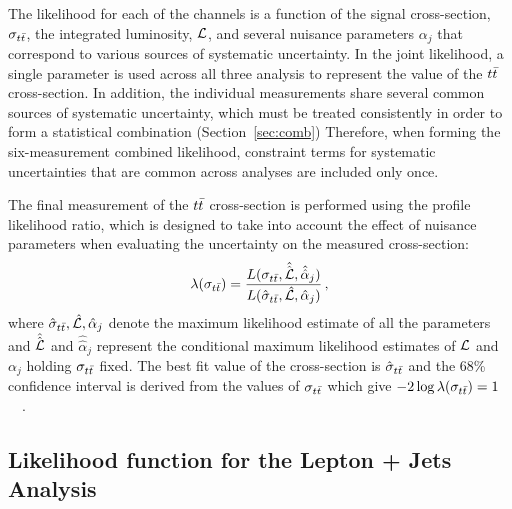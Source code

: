 The likelihood for each of the channels is a function of the signal cross-section, $\sigma_{t\bar{t}}$, the integrated luminosity, ${\cal L}$, and several nuisance parameters $\alpha_j$ that correspond to various sources of systematic uncertainty.
In the joint likelihood, a single parameter is used across all three analysis to represent the value of the $t\bar{t}$ cross-section.
In addition, the individual measurements share several common sources of systematic uncertainty,
which must be treated consistently in order to form a statistical combination (Section~\ref{sec:comb})
Therefore, when forming the six-measurement combined likelihood, constraint terms for systematic uncertainties that are common across analyses are included only once.


The final measurement of the $t\bar{t}$ cross-section is performed using the profile likelihood ratio,
which is designed to take into account the effect of nuisance parameters when evaluating the uncertainty on the measured cross-section:
\begin{equation}\label{Eq:lr_2}
  \lambda(\sigma_{t\bar{t}}) = \frac{L(\sigma_{t\bar{t}}, \hat{\hat{{\cal L}}}, \hat{\hat{\alpha}}_j)}{L(\hat \sigma_{t\bar{t}}, \hat {{\cal L}}, \hat \alpha_j)}\,,
\end{equation}
where  $\hat\sigma_{t\bar{t}}, \hat {{\cal L}}, \hat\alpha_j$ denote the maximum likelihood estimate of all the parameters and  $\hat{\hat{{\cal L}}}$ and $\hat{\hat{\alpha}}_j$ represent the conditional maximum likelihood estimates of ${\cal L}$ and $\alpha_j$ holding $\sigma_{t\bar{t}}$ fixed.   
The best fit value of the cross-section is $\hat\sigma_{t\bar{t}}$ and the 68\% confidence interval is derived from the values of $\sigma_{t\bar{t}}$ which give $-2\log \lambda(\sigma_{t\bar{t}})= 1$~\cite{James:1994vp}~\cite{asimov}.


\subsection{Likelihood function for the Lepton + Jets Analysis}

\label{sec:lepjets}

